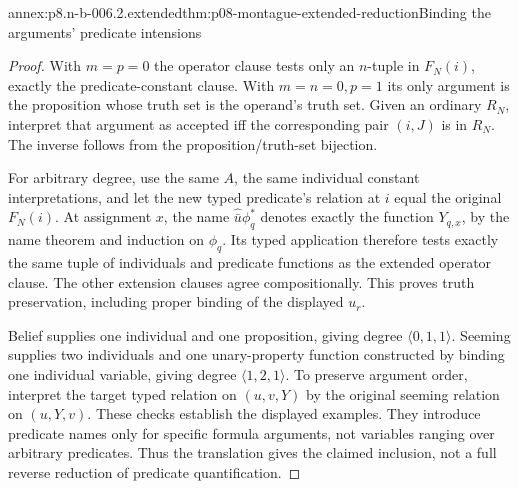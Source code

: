 \begin{annexitem}{annex:p8.n-b-006.2.extended}{thm:p08-montague-extended-reduction}{Binding the arguments' predicate intensions}
\begin{proof}
With \(m=p=0\) the operator clause tests only an \(n\)-tuple in
\(F_N(i)\), exactly the predicate-constant clause. With \(m=n=0,p=1\)
its only argument is the proposition whose truth set is the operand's
truth set. Given an ordinary \(R_N\), interpret that argument as
accepted iff the corresponding pair \((i,J)\) is in \(R_N\).
The inverse follows from the proposition/truth-set bijection.

For arbitrary degree, use the same \(A\), the same individual
constant interpretations, and let the new typed predicate's relation
at \(i\) equal the original \(F_N(i)\). At assignment \(x\), the
name \(\widehat{\bar u}\phi_q^*\) denotes exactly the function
\(Y_{q,x}\), by the name theorem and induction on \(\phi_q\).
Its typed application therefore tests exactly the same tuple of
individuals and predicate functions as the extended operator clause.
The other extension clauses agree compositionally. This proves truth
preservation, including proper binding of the displayed \(u_r\).

Belief supplies one individual and one proposition, giving degree
\(\langle0,1,1\rangle\). Seeming supplies two individuals and one
unary-property function constructed by binding one individual variable,
giving degree \(\langle1,2,1\rangle\). To preserve argument order,
interpret the target typed relation on \((u,v,Y)\) by the original
seeming relation on \((u,Y,v)\). These checks establish the displayed
examples. They introduce predicate names only for specific formula
arguments, not variables ranging over arbitrary predicates. Thus the
translation gives the claimed inclusion, not a full reverse reduction
of predicate quantification.
\end{proof}
\end{annexitem}

